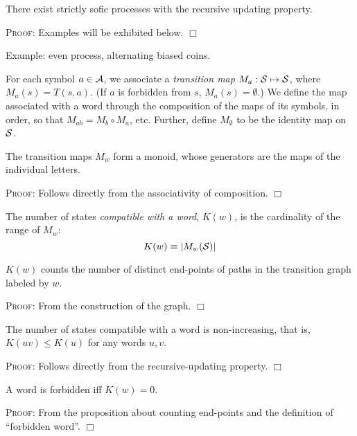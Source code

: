 \documentclass[../new-procedure.tex]{subfiles}
\begin{document}
\begin{proposition}
There exist strictly sofic processes with the recursive updating property.
\end{proposition}

\textsc{Proof}: Examples will be exhibited below.  $\Box$

Example: even process, alternating biased coins.

\begin{definition}
  For each symbol $a \in \mathcal{A}$, we associate a {\em transition map}
  $M_a: \mathcal{S} \mapsto \mathcal{S}$, where $M_a(s) = T(s,a)$.  (If $a$ is
  forbidden from $s$, $M_a(s) = \emptyset$.)  We define the map associated with
  a word through the composition of the maps of its symbols, in order, so that
  $M_{ab} = M_b \circ M_a$, etc.  Further, define $M_{\emptyset}$ to be the
  identity map on $\mathcal{S}$.
\end{definition}

\begin{proposition}
  The transition maps $M_w$ form a monoid, whose generators are the maps of the
  individual letters.
\end{proposition}

\textsc{Proof}: Follows directly from the associativity of composition. $\Box$

\begin{definition}
The number of states {\em compatible with a word}, $K(w)$, is the cardinality of the range of $M_w$:
\begin{equation}
K(w) \equiv | M_w(\mathcal{S})|
\end{equation}
\end{definition}

\begin{proposition}
  $K(w)$ counts the number of distinct end-points of paths in the transition
  graph labeled by $w$.
\end{proposition}
\textsc{Proof}: From the construction of the graph. $\Box$

\begin{proposition}
The number of states compatible with a word is non-increasing, that is,
$K(uv) \leq K(u)$ for any words $u, v$.
\label{proposition:transition-mappings-are-constrictive}
\end{proposition}
\textsc{Proof}: Follows directly from the recursive-updating property. $\Box$

\begin{proposition}
A word is forbidden iff $K(w) = 0$.
\end{proposition}
\textsc{Proof}: From the proposition about counting end-points and the
definition of ``forbidden word''. $\Box$
\end{document}

